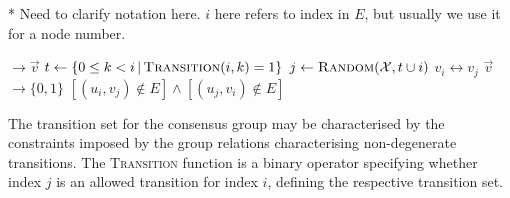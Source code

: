 \documentclass[twocolumn, aps, amsmath, amssymb, nofootinbib, superscriptaddress, longbibliography, floatfix, eqsecnum, rmp]{revtex4-2}
\let\oldalgorithmic\algorithmic
\let\endoldalgorithmic\endalgorithmic
\renewenvironment{algorithmic}
{\begin{adjustwidth}{-1em}{}\oldalgorithmic}
{\endoldalgorithmic\end{adjustwidth}}
\begin{document}


%

* Need to clarify notation here. $i$ here refers to index in $E$, but usually we use it for a node number.


%

\begin{algorithm}[H]
\begin{algorithmic}
 $\to \vec{v}$ 
	 
		\State $t \gets \{0\leq k< i \,|\, \textsc{Transition}(i,k) = 1\}$ 
		\State $j \gets \textsc{Random}(\mathcal{X}, t \cup i)$ 
		\State $v_i\leftrightarrow v_j$ 
	\EndFor
	\State \Return $\vec{v}$
\EndFunction
\\
 $\to \{0,1\}$ 
	\State \Return $[(u_i,v_j) \notin E] \land [(u_j,v_i) \notin E]$
\EndFunction
\end{algorithmic}	
\caption{The transition set for the consensus group may be characterised by the constraints imposed by the group relations characterising non-degenerate transitions. The \textsc{Transition} function is a binary operator specifying whether index $j$ is an allowed transition for index $i$, defining the respective transition set.}\label{alg:consensus_shuffle}
\end{algorithm}
\end{document}
